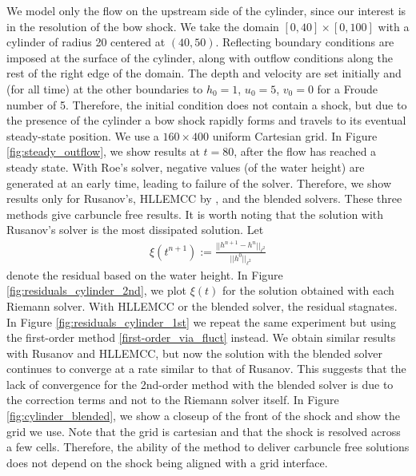 \documentclass[preprint, 11pt]{article}
\begin{document}
We model only the flow on the upstream side of the cylinder, since
our interest is in the resolution of the bow shock.  We take the domain
$[0,40]\times[0,100]$ with a cylinder of radius 20 centered at $(40,50)$.
Reflecting boundary conditions are imposed at the surface of the cylinder,
along with outflow conditions along the rest of the right edge of the domain.
{\color{red} The depth and velocity are set initially and (for all time) at the other
  boundaries to $h_0=1$, $u_0=5$, $v_0=0$ for a Froude number of 5. Therefore, 
  the initial condition does not contain a shock, but due to the presence of the 
  cylinder a bow shock rapidly forms and travels to its eventual steady-state position.}
  We use a $160 \times 400$ uniform Cartesian grid.
%
In Figure \ref{fig:steady_outflow}, we show results at $t=80$, after the flow has reached
a steady state.  With Roe's solver, negative values (of the water height) are generated at an early
time, leading to failure of the solver.  Therefore, we show results only for
Rusanov's, HLLEMCC by \cite{kemm2014note}, and the blended solvers.
{\color{red}
  These three methods give carbuncle free results.
  It is worth noting that the solution with Rusanov's solver is the most dissipated solution. 
  Let 
  \begin{align}\label{res}
    \xi(t^{n+1}):=\frac{||h^{n+1}-h^n||_{\ell^2}}{||h^0||_{\ell^2}}
  \end{align}
  denote the residual based on the water height. In Figure \ref{fig:residuals_cylinder_2nd}, we plot $\xi(t)$ for the
  solution obtained with each Riemann solver. With HLLEMCC or the blended solver, the residual stagnates. 
  In Figure \ref{fig:residuals_cylinder_1st} we repeat the same experiment but using the first-order method \eqref{first-order_via_fluct} instead.
  We obtain similar results with Rusanov and HLLEMCC, but now the solution with the blended solver continues to converge
  at a rate similar to that of Rusanov.  This suggests that the lack of convergence for the 2nd-order method with the
  blended solver is due to the correction terms and not to the Riemann solver itself.
  In Figure \ref{fig:cylinder_blended}, we show a closeup of the front of the shock and show the grid we use.
  Note that the grid is cartesian and that the shock is resolved across a few
  cells. Therefore, the ability of the method to deliver
  carbuncle free solutions does not depend on the shock being aligned with a grid interface. 
}
\end{document}
